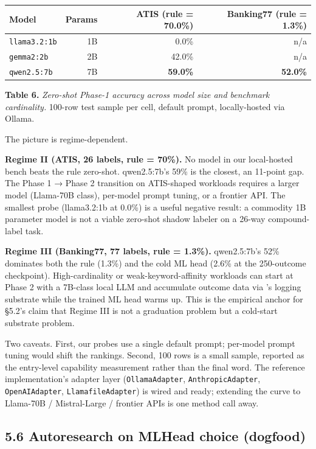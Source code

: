 {\def\LTcaptype{none} %
\begin{longtable}[]{@{}lrrr@{}}
\toprule\noalign{}
Model & Params & ATIS (rule = 70.0\%) & Banking77 (rule = 1.3\%) \\
\midrule\noalign{}
\endhead
\bottomrule\noalign{}
\endlastfoot
\texttt{llama3.2:1b} & 1B & 0.0\% & n/a \\
\texttt{gemma2:2b} & 2B & 42.0\% & n/a \\
\texttt{qwen2.5:7b} & 7B & \textbf{59.0\%} & \textbf{52.0\%} \\
\end{longtable}
}

\textbf{Table 6.} \emph{Zero-shot Phase-1 accuracy across model size and
benchmark cardinality.} 100-row test sample per cell, default prompt,
locally-hosted via Ollama.

The picture is regime-dependent.

\textbf{Regime II (ATIS, 26 labels, rule = 70\%).} No model in our
local-hosted bench beats the rule zero-shot. qwen2.5:7b's 59\% is the
closest, an 11-point gap. The Phase 1 → Phase 2 transition on
ATIS-shaped workloads requires a larger model (Llama-70B class),
per-model prompt tuning, or a frontier API. The smallest probe
(llama3.2:1b at 0.0\%) is a useful negative result: a commodity 1B
parameter model is not a viable zero-shot shadow labeler on a 26-way
compound-label task.

\textbf{Regime III (Banking77, 77 labels, rule = 1.3\%).} qwen2.5:7b's
52\% dominates both the rule (1.3\%) and the cold ML head (2.6\% at the
250-outcome checkpoint). High-cardinality or weak-keyword-affinity
workloads can start at Phase 2 with a 7B-class local LLM and accumulate
outcome data via \sysname{}'s logging substrate while the trained ML head
warms up. This is the empirical anchor for §5.2's claim that Regime III
is not a graduation problem but a cold-start substrate problem.

Two caveats. First, our probes use a single default prompt; per-model
prompt tuning would shift the rankings. Second, 100 rows is a small
sample, reported as the entry-level capability measurement rather than
the final word. The reference implementation's adapter layer
(\texttt{OllamaAdapter}, \texttt{AnthropicAdapter},
\texttt{OpenAIAdapter}, \texttt{LlamafileAdapter}) is wired and ready;
extending the curve to Llama-70B / Mistral-Large / frontier APIs is one
method call away.

\subsection{5.6 Autoresearch on MLHead choice
(dogfood)}\label{autoresearch-on-mlhead-choice-dogfood}

